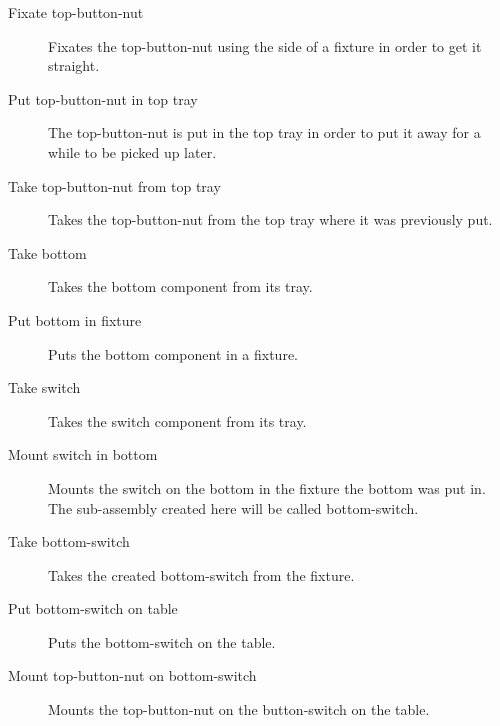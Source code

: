 \begin{description}
\item[Fixate top-button-nut] Fixates the top-button-nut using the side of a fixture in order to get it straight.

\item[Put top-button-nut in top tray] The top-button-nut is put in the top tray in order to put it away for a while to be picked up later.

\item[Take top-button-nut from top tray] Takes the top-button-nut from the top tray where it was previously put.

\item[Take bottom] Takes the bottom component from its tray.

\item[Put bottom in fixture] Puts the bottom component in a fixture.

\item[Take switch] Takes the switch component from its tray.

\item[Mount switch in bottom] Mounts the switch on the bottom in the fixture the bottom was put in. The sub-assembly created here will be called bottom-switch.

\item[Take bottom-switch] Takes the created bottom-switch from the fixture.

\item[Put bottom-switch on table] Puts the bottom-switch on the table.

\item[Mount top-button-nut on bottom-switch] Mounts the top-button-nut on the button-switch on the table.
\end{description}

